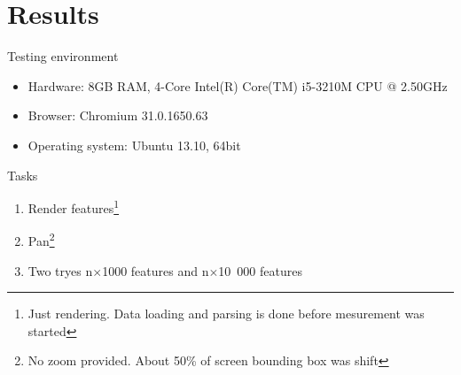 \documentclass[xcolor=dvipsnames]{beamer}
\begin{document}
\section{Results}

\begin{frame}{Testing environment}
\begin{itemize}[<+->]
    \item Hardware: 8GB RAM, 4-Core Intel(R) Core(TM) i5-3210M CPU @ 2.50GHz
    \item Browser: Chromium 31.0.1650.63
    \item Operating system: Ubuntu 13.10, 64bit
\end{itemize}
\end{frame}

\begin{frame}{Tasks}
\begin{enumerate}[<+->]
    \item Render features\footnote{Just rendering. Data loading and parsing is
        done before mesurement was started}
    \item Pan\footnote{No zoom provided. About 50\% of screen bounding box was
        shift}
    \item Two tryes n$\times$1000 features and n$\times$10~000 features
\end{enumerate}
\end{frame}
\end{document}
